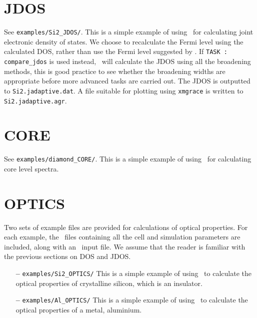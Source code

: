 \documentclass[a4paper,11pt,twoside]{book}
\begin{document}
{\section{JDOS}
See  \verb#examples/Si2_JDOS/#. This is a simple example of using \optados\ for calculating joint electronic density of states.  We choose to recalculate the Fermi level using the calculated DOS, rather than use the Fermi level suggested by \castep.  If {\tt TASK : compare\_jdos} is used instead, \optados\ will calculate the JDOS using all the broadening methods, this is good practice to see whether the broadening widths are appropriate before more advanced tasks are carried out.  The JDOS is outputted to {\tt Si2.jadaptive.dat}. A file suitable for plotting using {\tt xmgrace} is written to {\tt Si2.jadaptive.agr}. 

\section{CORE}
See  \verb#examples/diamond_CORE/#. This is a simple example of using \optados\ for calculating core level spectra. 

\section{OPTICS}
Two sets of example files are provided for calculations of optical properties.  For each example, the \castep\ files containing all the cell and simulation parameters are included, along with an \optados\ input file. We assume that the reader is familiar with the previous sections on DOS and JDOS.  
\begin{itemize}
\item[{\bf --}]  \verb#examples/Si2_OPTICS/#  This is a simple example of using \optados\ to calculate the optical properties of crystalline silicon, which is an insulator.   
\item[{\bf --}]\verb#examples/Al_OPTICS/#  This is a simple example of using \optados\ to calculate the optical properties of a metal, aluminium. 
\end{itemize}

}
\end{document}
